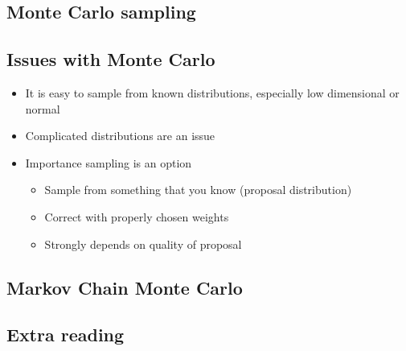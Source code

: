 \documentclass[letterpaper,10pt,english]{jupyterBook}
\begin{document}
\subsection{Monte Carlo sampling}
\label{\detokenize{Lecture 3:monte-carlo-sampling}}





\subsection{Issues with Monte Carlo}
\label{\detokenize{Lecture 3:issues-with-monte-carlo}}\begin{itemize}
\item {} 
\sphinxAtStartPar
It is easy to sample from known distributions, especially low dimensional or normal

\item {} 
\sphinxAtStartPar
Complicated distributions are an issue

\item {} 
\sphinxAtStartPar
Importance sampling is an option
\begin{itemize}
\item {} 
\sphinxAtStartPar
Sample from something that you know (proposal distribution)

\item {} 
\sphinxAtStartPar
Correct with properly chosen weights

\item {} 
\sphinxAtStartPar
Strongly depends on quality of proposal

\end{itemize}

\end{itemize}


\subsection{Markov Chain Monte Carlo}
\label{\detokenize{Lecture 3:markov-chain-monte-carlo}}





\subsection{Extra reading}
\label{\detokenize{Lecture 3:extra-reading}}
\sphinxAtStartPar
{}
\end{document}
